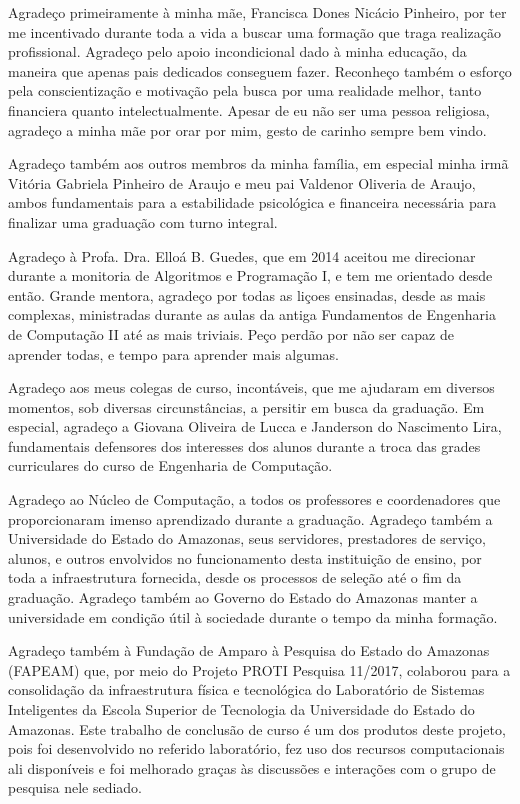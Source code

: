 Agradeço primeiramente à minha mãe, Francisca Dones Nicácio Pinheiro, por ter me incentivado durante toda a vida a buscar uma formação que traga realização profissional. Agradeço pelo apoio incondicional dado à minha educação, da maneira que apenas pais dedicados conseguem fazer. Reconheço também o esforço pela conscientização e motivação pela busca por uma realidade melhor, tanto financiera quanto intelectualmente. Apesar de eu não ser uma pessoa religiosa, agradeço a minha mãe por orar por mim, gesto de carinho sempre bem vindo.

Agradeço também aos outros membros da minha família, em especial minha irmã Vitória Gabriela Pinheiro de Araujo e meu pai Valdenor Oliveria de Araujo, ambos fundamentais para a estabilidade psicológica e financeira necessária para finalizar uma graduação com turno integral.

Agradeço à Profa. Dra. Elloá B. Guedes, que em 2014 aceitou me direcionar durante a monitoria de Algoritmos e Programação I, e tem me orientado desde então. Grande mentora, agradeço por todas as liçoes ensinadas, desde as mais complexas, ministradas durante as aulas da antiga Fundamentos de Engenharia de Computação II até as mais triviais. Peço perdão por não ser capaz de aprender todas, e tempo para aprender mais algumas.

Agradeço aos meus colegas de curso, incontáveis, que me ajudaram em diversos momentos, sob diversas circunstâncias, a persitir em busca da graduação. Em especial, agradeço a Giovana Oliveira de Lucca e Janderson do Nascimento Lira, fundamentais defensores dos interesses dos alunos durante a troca das grades curriculares do curso de Engenharia de Computação.

Agradeço ao Núcleo de Computação, a todos os professores e coordenadores que proporcionaram imenso aprendizado durante a graduação. Agradeço também a Universidade do Estado do Amazonas, seus servidores, prestadores de serviço, alunos, e outros envolvidos no funcionamento desta instituição de ensino, por toda a infraestrutura fornecida, desde os processos de seleção até o fim da graduação. Agradeço também ao Governo do Estado do Amazonas manter a universidade em condição útil à sociedade durante o tempo da minha formação.

Agradeço também à Fundação de Amparo à Pesquisa do Estado do Amazonas (FAPEAM) que, por meio do Projeto PROTI Pesquisa 11/2017, colaborou para a consolidação da infraestrutura física e tecnológica do Laboratório de Sistemas Inteligentes da Escola Superior de Tecnologia da Universidade do Estado do Amazonas. Este trabalho de conclusão de curso é um dos produtos deste projeto, pois foi desenvolvido no referido laboratório, fez uso dos recursos  computacionais ali disponíveis e foi melhorado graças às discussões e interações com o grupo de pesquisa nele sediado.
